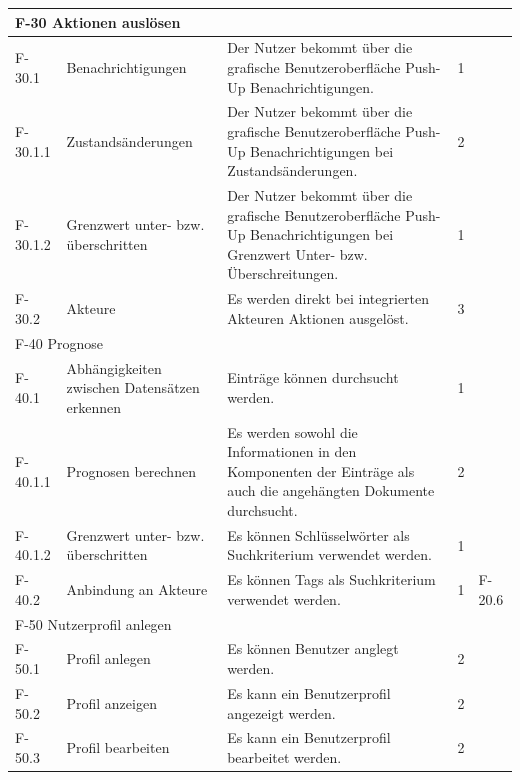 \begin{tabularx}{\textwidth}{|l|X|X|l|l|}
    \hline
    \multicolumn{5}{|l|}{F-30 Aktionen auslösen}\\
    \hline
    F-30.1 & Benachrichtigungen & Der Nutzer bekommt über die grafische Benutzeroberfläche Push-Up Benachrichtigungen. & 1 & \\
    F-30.1.1 & Zustandsänderungen & Der Nutzer bekommt über die grafische Benutzeroberfläche Push-Up Benachrichtigungen bei Zustandsänderungen. & 2 & \\
    F-30.1.2 & Grenzwert unter- bzw. überschritten & Der Nutzer bekommt über die grafische Benutzeroberfläche Push-Up Benachrichtigungen bei Grenzwert Unter- bzw. Überschreitungen. & 1 & \\
    F-30.2 & Akteure & Es werden direkt bei integrierten Akteuren Aktionen ausgelöst. & 3 & \\
    \hline
    \multicolumn{5}{|l|}{F-40 Prognose}\\
    \hline
    F-40.1 & Abhängigkeiten zwischen Datensätzen erkennen & Einträge können durchsucht werden. & 1 &\\
    F-40.1.1 & Prognosen berechnen & Es werden sowohl die Informationen in den Komponenten der Einträge als auch die angehängten Dokumente durchsucht. & 2 & \\
    F-40.1.2 & Grenzwert unter- bzw. überschritten & Es können Schlüsselwörter als Suchkriterium verwendet werden. & 1 &\\
    F-40.2 & Anbindung an Akteure & Es können Tags als Suchkriterium verwendet werden. & 1 & F-20.6\\
    \hline
    \multicolumn{5}{|l|}{F-50 Nutzerprofil anlegen}\\
    \hline
    F-50.1 & Profil anlegen & Es können Benutzer anglegt werden. & 2 & \\
    F-50.2 & Profil anzeigen & Es kann ein Benutzerprofil angezeigt werden. & 2 & \\
    F-50.3 & Profil bearbeiten & Es kann ein Benutzerprofil bearbeitet werden. & 2 & \\
    \bottomrule

\end{tabularx}

